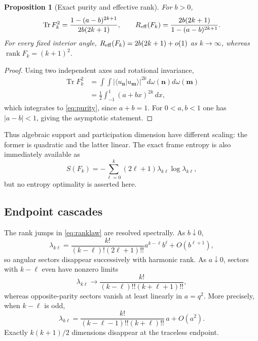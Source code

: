 \documentclass[11pt]{article}
\newtheorem{proposition}[theorem]{Proposition}
\theoremstyle{definition}
\theoremstyle{remark}
\newcommand{\rank}{\operatorname{rank}}
\newcommand{\Tr}{\operatorname{Tr}}
\begin{document}
\begin{proposition}[Exact purity and effective rank]\label{prop:purity}
For $b>0$,
\begin{equation}\label{eq:purity}
 \Tr F_k^2=
 \frac{1-(a-b)^{2k+1}}{2b(2k+1)},
 \qquad
 R_{\rm eff}(F_k)=
 \frac{2b(2k+1)}{1-(a-b)^{2k+1}}.
\end{equation}
For every fixed interior angle, $R_{\rm eff}(F_k)=2b(2k+1)+o(1)$ as
$k\to\infty$, whereas $\rank F_k=(k+1)^2$.
\end{proposition}

\begin{proof}
Using two independent axes and rotational invariance,
\begin{align}
 \Tr F_k^2
 &=\int\!\!\int
 |\langle u_{\bm n}|u_{\bm m}\rangle|^{2k}
 d\omega(\bm n)d\omega(\bm m)\\
 &=\frac12\int_{-1}^{1}(a+bx)^{2k}\,dx,
\end{align}
which integrates to \cref{eq:purity}, since $a+b=1$.  For $0<a,b<1$ one
has $|a-b|<1$, giving the asymptotic statement.
\end{proof}

Thus algebraic support and participation dimension have different scaling:
the former is quadratic and the latter linear.  The exact frame entropy is
also immediately available as
\begin{equation}
 S(F_k)=-\sum_{\ell=0}^k(2\ell+1)
 \lambda_{k\ell}\log\lambda_{k\ell},
\end{equation}
but no entropy optimality is asserted here.

\subsection{Endpoint cascades}

The rank jumps in \cref{eq:ranklaw} are resolved spectrally.  As $b\downarrow0$,
\begin{equation}\label{eq:centralcascade}
 \lambda_{k\ell}=
 \frac{k!}{(k-\ell)!(2\ell+1)!!}
 a^{k-\ell}b^\ell+O(b^{\ell+1}),
\end{equation}
so angular sectors disappear successively with harmonic rank.  As
$a\downarrow0$, sectors with $k-\ell$ even have nonzero limits
\begin{equation}
 \lambda_{k\ell}\longrightarrow
 \frac{k!}{(k-\ell)!!(k+\ell+1)!!},
\end{equation}
whereas opposite-parity sectors vanish at least linearly in $a=q^2$.
More precisely, when $k-\ell$ is odd,
\begin{equation}\label{eq:tracelesscascade}
 \lambda_{k\ell}=
 \frac{k!}{(k-\ell-1)!!(k+\ell)!!}\,a+O(a^2).
\end{equation}
Exactly $k(k+1)/2$ dimensions disappear at the traceless endpoint.
\end{document}
